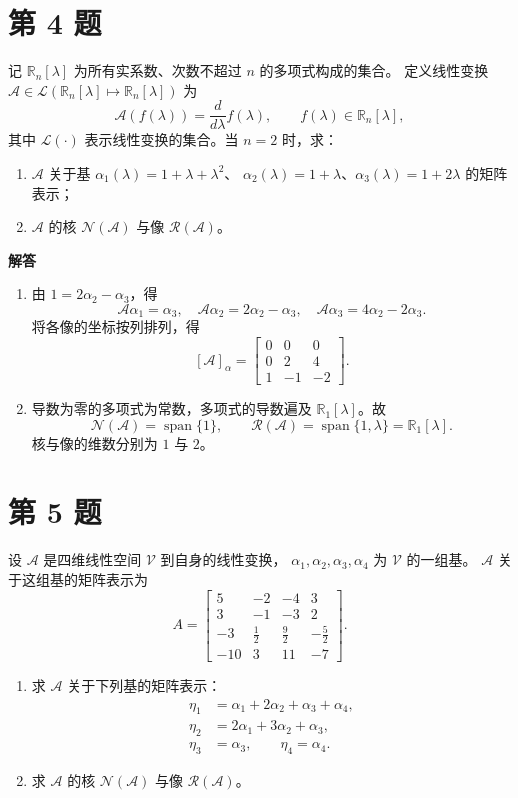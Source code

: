 \documentclass[UTF8,10pt,letterpaper,fontset=fandol]{ctexart}
\newcommand{\R}{\mathbb R}
\newcommand{\Span}{\operatorname{span}}
\newcommand{\Solution}{\par\Needspace{5\baselineskip}\textbf{解答}\par}
\begin{document}
\section{第 4 题}
记 \(\R_n[\lambda]\) 为所有实系数、次数不超过 \(n\) 的多项式构成的集合。
定义线性变换 \(\mathcal A\in\mathcal L(\R_n[\lambda]\mapsto\R_n[\lambda])\) 为
\[
\mathcal A(f(\lambda))=\frac{d}{d\lambda}f(\lambda),\qquad f(\lambda)\in\R_n[\lambda],
\]
其中 \(\mathcal L(\cdot)\) 表示线性变换的集合。当 \(n=2\) 时，求：
\begin{enumerate}
\item \(\mathcal A\) 关于基 \(\alpha_1(\lambda)=1+\lambda+\lambda^2\)、
\(\alpha_2(\lambda)=1+\lambda\)、\(\alpha_3(\lambda)=1+2\lambda\) 的矩阵表示；
\item \(\mathcal A\) 的核 \(\mathcal N(\mathcal A)\) 与像 \(\mathcal R(\mathcal A)\)。
\end{enumerate}

\Solution
\begin{enumerate}
\item 由 \(1=2\alpha_2-\alpha_3\)，得
\[
\mathcal A\alpha_1=\alpha_3,\quad
\mathcal A\alpha_2=2\alpha_2-\alpha_3,\quad
\mathcal A\alpha_3=4\alpha_2-2\alpha_3.
\]
将各像的坐标按列排列，得
\[
\boxed{[\mathcal A]_{\alpha}=\begin{bmatrix}0&0&0\\0&2&4\\1&-1&-2\end{bmatrix}}.
\]
\item 导数为零的多项式为常数，多项式的导数遍及 \(\R_1[\lambda]\)。故
\[
\boxed{\mathcal N(\mathcal A)=\Span\{1\}},\qquad
\boxed{\mathcal R(\mathcal A)=\Span\{1,\lambda\}=\R_1[\lambda]}.
\]
核与像的维数分别为 \(1\) 与 \(2\)。
\end{enumerate}

\section{第 5 题}
设 \(\mathcal A\) 是四维线性空间 \(\mathcal V\) 到自身的线性变换，
\(\alpha_1,\alpha_2,\alpha_3,\alpha_4\) 为 \(\mathcal V\) 的一组基。
\(\mathcal A\) 关于这组基的矩阵表示为
\[
A=\begin{bmatrix}
5&-2&-4&3\\3&-1&-3&2\\-3&\tfrac12&\tfrac92&-\tfrac52\\-10&3&11&-7
\end{bmatrix}.
\]
\begin{enumerate}
\item 求 \(\mathcal A\) 关于下列基的矩阵表示：
\[
\begin{aligned}
\eta_1&=\alpha_1+2\alpha_2+\alpha_3+\alpha_4,\\
\eta_2&=2\alpha_1+3\alpha_2+\alpha_3,\\
\eta_3&=\alpha_3,\qquad \eta_4=\alpha_4.
\end{aligned}
\]
\item 求 \(\mathcal A\) 的核 \(\mathcal N(\mathcal A)\) 与像 \(\mathcal R(\mathcal A)\)。
\end{enumerate}
\end{document}
